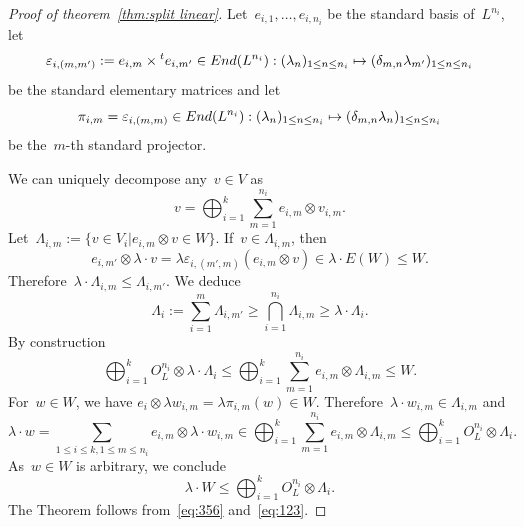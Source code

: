 \documentclass[10pt,a4paper]{amsart}
\newcommand{\End}{{\rm End}}
\newcommand{\eps}{{\varepsilon}}
\newcommand{\tens}{\otimes}
\begin{document}
\begin{proof}[Proof of theorem~\ref{thm:split linear}]
Let~$e_{i,1},\ldots,e_{i,n_i}$ be the standard basis of~${L}^{n_i}$, let
\[
\eps_{i,(m,m')}:= e_{i,m}\times {}^te_{i,m'}\in \End(L^{n_i}):(\lambda_n)_{1\leq n\leq n_i}\mapsto (\delta_{m,n} \lambda_{m'})_{1\leq n\leq n_i}
\]
be the standard elementary matrices and let~
\[
\pi_{i,m}=\eps_{i,(m,m)}\in \End(L^{n_i}):(\lambda_n)_{1\leq n\leq n_i}\mapsto (\delta_{m,n} \lambda_n)_{1\leq n\leq n_i}
\]
be the~$m$-th standard projector.

We can uniquely decompose any~$v\in V$ as
\[
v=\bigoplus_{i=1}^k \sum^{n_i}_{m=1} e_{i,m}\tens v_{i,m}.
\]
Let~$\Lambda_{i,m}:=\{v\in V_i|e_{i,m}\tens v\in W\}$. If~$v\in \Lambda_{i,m}$,
then
\[
e_{i,m'}\tens \lambda \cdot v = \lambda \eps_{i,(m',m)}(e_{i,m}\tens v)\in \lambda\cdot E(W)\leq W.
\]
Therefore~$\lambda\cdot \Lambda_{i,m}\leq \Lambda_{i,m'}$. We deduce
\[
\Lambda_i:=\sum_{i=1}^{m}\Lambda_{i,m'}\geq \bigcap_{i=1}^{n_i} \Lambda_{i,m}\geq \lambda\cdot \Lambda_i.
\]
By construction
\begin{equation}\label{eq:356}
\bigoplus_{i=1}^k O_L^{n_i}\tens \lambda\cdot \Lambda_i
\leq 
\bigoplus_{i=1}^k \sum^{n_i}_{m=1} e_{i,m}\tens \Lambda_{i,m}
\leq W.
\end{equation}
For~$w\in W$, we have
\(
e_i\tens \lambda w_{i,m}=\lambda \pi_{i,m}(w)\in W.
\)
Therefore~$\lambda\cdot w_{i,m}\in \Lambda_{i,m}$ and
\[
\lambda\cdot w=\sum_{1\leq i\leq k,1\leq m\leq n_i}e_{i,m}\tens \lambda\cdot w_{i,m}\in 
\bigoplus_{i=1}^k \sum^{n_i}_{m=1} e_{i,m}\tens \Lambda_{i,m}\leq \bigoplus_{i=1}^k O_L^{n_i}\tens \Lambda_i.
\]
As~$w\in W$ is arbitrary, we conclude
\begin{equation}\label{eq:123}
\lambda\cdot W\leq \bigoplus_{i=1}^k O_L^{n_i}\tens \Lambda_i.
\end{equation}
The Theorem follows from~\eqref{eq:356} and~\eqref{eq:123}.
\end{proof}
\end{document}

